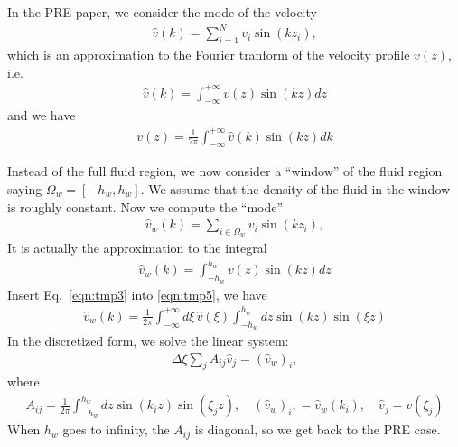 \documentclass[aip,jcp,a4paper,reprint,onecolumn]{revtex4-1}
\begin{document}
In the PRE paper, we consider the mode of the velocity
\begin{align}
  \hat v(k) = \sum_{i=1}^N v_i \sin(k z_i),
\end{align}
which is an approximation to the Fourier tranform of the velocity profile $v(z)$, i.e.
\begin{align}
  \hat v(k) = \int_{-\infty}^{+\infty} v(z) \sin(kz) dz
\end{align}
and we have
\begin{align}\label{eqn:tmp3}
  v(z) = \frac1{2\pi}\int_{-\infty}^{+\infty} \hat v(k)\sin(kz) dk
\end{align}

Instead of the full fluid region, we now consider a ``window'' of the fluid region saying
$\Omega_w = [-h_w, h_w]$.
We assume that the density of the fluid in the window is roughly constant.
Now we compute the ``mode''
\begin{align}
  \hat v_w(k) = \sum_{i\in\Omega_w} v_i \sin(k z_i),
\end{align}
It is actually the approximation to the integral
\begin{align}\label{eqn:tmp5}
  \hat v_w(k) = \int_{-h_w}^{h_w} v(z) \sin(kz) dz
\end{align}
Insert Eq.~\eqref{eqn:tmp3} into \eqref{eqn:tmp5}, we have
\begin{align}
  \hat v_w(k) = \frac{1}{2\pi}\int_{-\infty}^{+\infty} d\xi \,\hat v(\xi) \int_{-h_w}^{h_w}dz  \sin(kz) \sin(\xi z)
\end{align}
In the discretized form, we solve the linear system:
\begin{align}
  \Delta \xi\sum_j A_{ij} \hat v_j = (\hat v_w)_i, 
\end{align}
where
\begin{align}
  A_{ij} = \frac{1}{2\pi} \int_{-h_w}^{h_w}dz  \sin(k_i z) \sin(\xi_j z), \quad (\hat v_w)_i,  = \hat v_w(k_i), \quad \hat v_j  =  v(\xi_j) 
\end{align}
When $h_w$ goes to infinity, the $A_{ij}$ is diagonal, so we get back to the PRE case.
\end{document}
